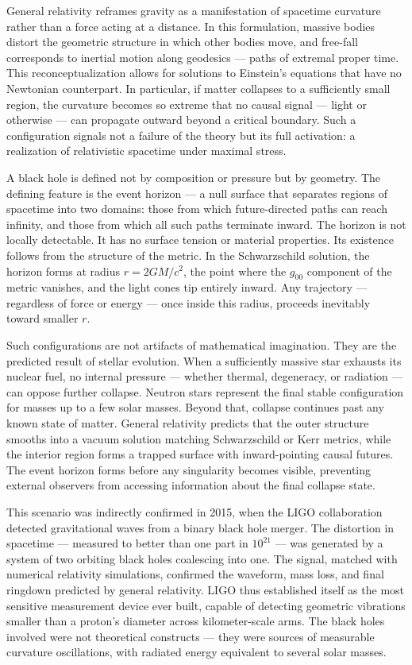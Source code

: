 General relativity reframes gravity as a manifestation of spacetime curvature rather than a force acting at a distance. In this formulation, massive bodies distort the geometric structure in which other bodies move, and free-fall corresponds to inertial motion along geodesics — paths of extremal proper time. This reconceptualization allows for solutions to Einstein's equations that have no Newtonian counterpart. In particular, if matter collapses to a sufficiently small region, the curvature becomes so extreme that no causal signal — light or otherwise — can propagate outward beyond a critical boundary. Such a configuration signals not a failure of the theory but its full activation: a realization of relativistic spacetime under maximal stress.


A black hole is defined not by composition or pressure but by geometry. The defining feature is the event horizon — a null surface that separates regions of spacetime into two domains: those from which future-directed paths can reach infinity, and those from which all such paths terminate inward. The horizon is not locally detectable. It has no surface tension or material properties. Its existence follows from the structure of the metric. In the Schwarzschild solution, the horizon forms at radius $r = 2GM/c^2$, the point where the $g_{00}$ component of the metric vanishes, and the light cones tip entirely inward. Any trajectory — regardless of force or energy — once inside this radius, proceeds inevitably toward smaller $r$.


Such configurations are not artifacts of mathematical imagination. They are the predicted result of stellar evolution. When a sufficiently massive star exhausts its nuclear fuel, no internal pressure — whether thermal, degeneracy, or radiation — can oppose further collapse. Neutron stars represent the final stable configuration for masses up to a few solar masses. Beyond that, collapse continues past any known state of matter. General relativity predicts that the outer structure smooths into a vacuum solution matching Schwarzschild or Kerr metrics, while the interior region forms a trapped surface with inward-pointing causal futures. The event horizon forms before any singularity becomes visible, preventing external observers from accessing information about the final collapse state.


This scenario was indirectly confirmed in 2015, when the LIGO collaboration detected gravitational waves from a binary black hole merger. The distortion in spacetime — measured to better than one part in $10^{21}$ — was generated by a system of two orbiting black holes coalescing into one. The signal, matched with numerical relativity simulations, confirmed the waveform, mass loss, and final ringdown predicted by general relativity. LIGO thus established itself as the most sensitive measurement device ever built, capable of detecting geometric vibrations smaller than a proton's diameter across kilometer-scale arms. The black holes involved were not theoretical constructs — they were sources of measurable curvature oscillations, with radiated energy equivalent to several solar masses.


